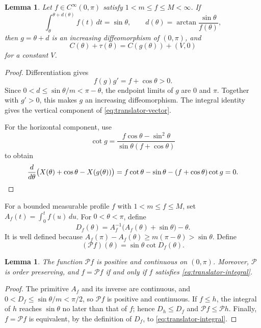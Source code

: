 \documentclass[11pt]{article}
\numberwithin{equation}{section}
\newtheorem{lemma}[theorem]{Lemma}
\begin{document}
\begin{lemma}\label{lem:translator-equation}
Let \(f\in C^\infty(0,\pi)\) satisfy \(1<m\leq f\leq M<\infty\). If
\begin{equation}\label{eq:translator-integral}
  \int_\theta^{\theta+d(\theta)}f(t)\,dt=\sin\theta,
  \qquad d(\theta)=\arctan\frac{\sin\theta}{f(\theta)},
\end{equation}
then \(g=\theta+d\) is an increasing diffeomorphism of \((0,\pi)\), and
\begin{equation}\label{eq:translator-vector}
  C(\theta)+\tau(\theta)=C(g(\theta))+(V,0)
\end{equation}
for a constant \(V\).
\end{lemma}

\begin{proof}
Differentiation gives
\[
  f(g)g'=f+\cos\theta>0.
\]
Since \(0<d\leq\sin\theta/m<\pi-\theta\), the endpoint limits of \(g\)
are \(0\) and \(\pi\). Together with \(g'>0\), this makes \(g\) an
increasing diffeomorphism. The integral identity gives the vertical component of
\eqref{eq:translator-vector}.

For the horizontal component, use
\[
  \cot g=\frac{f\cos\theta-\sin^2\theta}{\sin\theta(f+\cos\theta)}
\]
to obtain
\[
  \frac d{d\theta}\bigl(X(\theta)+\cos\theta-X(g(\theta))\bigr)
  =f\cot\theta-\sin\theta-(f+\cos\theta)\cot g=0.
  \qedhere
\]
\end{proof}

For a bounded measurable profile \(f\) with \(1<m\leq f\leq M\), set
\(A_f(t)=\int_0^t f(u)\,du\). For \(0<\theta<\pi\), define
\begin{equation}\label{eq:Df}
  D_f(\theta)=A_f^{-1}\bigl(A_f(\theta)+\sin\theta\bigr)-\theta.
\end{equation}
It is well defined because
\(A_f(\pi)-A_f(\theta)\geq m(\pi-\theta)>\sin\theta\). Define
\begin{equation}\label{eq:Poperator}
  (\mathcal P f)(\theta)=\sin\theta\cot D_f(\theta).
\end{equation}

\begin{lemma}\label{lem:Pmonotone}
The function \(\mathcal P f\) is positive and continuous on \((0,\pi)\).
Moreover, \(\mathcal P\) is order preserving, and \(f=\mathcal P f\) if and
only if \(f\) satisfies \eqref{eq:translator-integral}.
\end{lemma}

\begin{proof}
The primitive \(A_f\) and its inverse are continuous, and
\(0<D_f\leq\sin\theta/m<\pi/2\), so \(\mathcal P f\) is positive and
continuous. If \(f\leq h\), the integral of \(h\) reaches \(\sin\theta\)
no later than that of \(f\); hence \(D_h\leq D_f\) and
\(\mathcal P f\leq\mathcal P h\). Finally, \(f=\mathcal P f\) is
equivalent, by the definition of \(D_f\), to
\eqref{eq:translator-integral}.
\end{proof}
\end{document}
